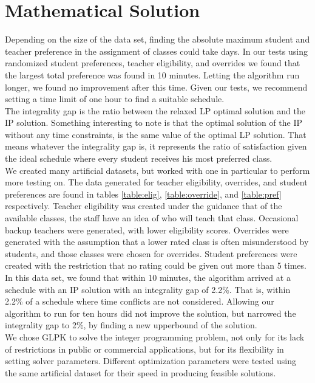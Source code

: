 \documentclass[11pt]{article}
\begin{document}
\section{Mathematical Solution}
\indent Depending on the size of the data set, finding the absolute maximum student and teacher preference in the assignment of classes could take days. In our tests using randomized student preferences, teacher eligibility, and overrides we found that the largest total preference was found in 10 minutes. Letting the algorithm run longer, we found no improvement after this time.  Given our tests, we recommend setting a time limit of one hour to find a suitable schedule.\\
\indent The integrality gap is the ratio between the relaxed LP optimal solution and the IP solution. Something interesting to note is that the optimal solution of the IP without any time constraints, is the same value of the optimal LP solution. That means whatever the integrality gap is, it represents the ratio of satisfaction given the ideal schedule where every student receives his most preferred class.\\
\indent We created many artificial datasets, but worked with one in particular to perform more testing on. The data generated for teacher eligibility, overrides, and student preferences are found in tables \ref{table:elig}, \ref{table:override}, and \ref{table:pref} respectively. Teacher eligibility was created under the guidance that of the available classes, the staff have an idea of who will teach that class. Occasional backup teachers were generated, with lower eligibility scores. Overrides were generated with the assumption that a lower rated class is often misunderstood by students, and those classes were chosen for overrides. Student preferences were created with the restriction that no rating could be given out more than 5 times.\\
\indent In this data set, we found that within 10 minutes, the algorithm arrived at a schedule with an IP solution with an integrality gap of 2.2\%. That is, within 2.2\% of a schedule where time conflicts are not considered. Allowing our algorithm to run for ten hours did not improve the solution, but narrowed the integrality gap to 2\%, by finding a new upperbound of the solution.\\
\indent We chose GLPK to solve the integer programming problem, not only for its lack of restrictions in public or commercial applications, but for its flexibility in setting solver parameters. Different optimization parameters were tested using the same artificial dataset for their speed in producing feasible solutions.\\\\
\end{document}

